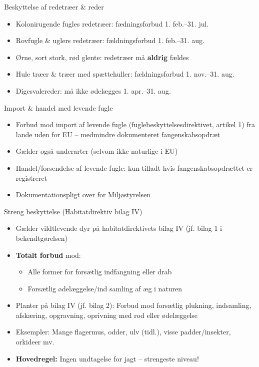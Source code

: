 \begin{frame}{Beskyttelse af redetræer \& reder}
\begin{itemize}
  \item Kolonirugende fugles redetræer: fædningsforbud 1. feb.–31. jul.
  \item Rovfugle \& uglers redetræer: fældningsforbud 1. feb.–31. aug.
  \item Ørne, sort stork, rød glente: redetræer må \textbf{aldrig} fældes
  \item Hule træer \& træer med spættehuller: fældningsforbud 1. nov.–31. aug.
  \item Digesvalereder: må ikke ødelægges 1. apr.–31. aug.
\end{itemize}
\end{frame}

\begin{frame}{Import \& handel med levende fugle}
\begin{itemize}
  \item Forbud mod import af levende fugle (fuglebeskyttelsesdirektivet, artikel 1) fra lande uden for EU – medmindre dokumenteret fangenskabsopdræt
  \item Gælder også underarter (selvom ikke naturlige i EU)
  \item Handel/forsendelse af levende fugle: kun tilladt hvis fangenskabsopdrættet er registreret
  \item Dokumentationspligt over for Miljøstyrelsen
\end{itemize}
\end{frame}

\begin{frame}{Streng beskyttelse (Habitatdirektiv bilag IV)}
\begin{itemize}
  \item Gælder vildtlevende dyr på habitatdirektivets bilag IV (jf. bilag 1 i bekendtgørelsen)
  \item \textbf{Totalt forbud} mod:
  \begin{itemize}
    \item Alle former for forsætlig indfangning eller drab
    \item Forsætlig ødelæggelse/ind samling af æg i naturen
  \end{itemize}
  \item Planter på bilag IV (jf. bilag 2): Forbud mod forsætlig plukning, indsamling, afskæring, opgravning, oprivning med rod eller ødelæggelse
  \item Eksempler: Mange flagermus, odder, ulv (tidl.), visse padder/insekter, orkideer mv.
  \item \textbf{Hovedregel:} Ingen undtagelse for jagt – strengeste niveau!
\end{itemize}
\end{frame}


